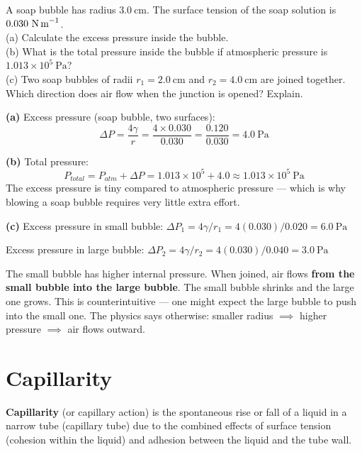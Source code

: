 \begin{examplebox}[12.2]
A soap bubble has radius $3.0\ \text{cm}$.
The surface tension of the soap solution is
$0.030\ \text{N\,m}^{-1}$.\\
(a) Calculate the excess pressure inside the bubble.\\
(b) What is the total pressure inside the bubble if
atmospheric pressure is $1.013\times10^5\ \text{Pa}$?\\
(c) Two soap bubbles of radii $r_1 = 2.0\ \text{cm}$
and $r_2 = 4.0\ \text{cm}$ are joined together.
Which direction does air flow when the junction is
opened? Explain.
\end{examplebox}

\begin{solutionbox}
\textbf{(a)} Excess pressure (soap bubble, two surfaces):
\[
  \Delta P = \frac{4\gamma}{r}
  = \frac{4 \times 0.030}{0.030}
  = \frac{0.120}{0.030} = 4.0\ \text{Pa}
\]

\textbf{(b)} Total pressure:
\[
  P_{total} = P_{atm} + \Delta P
  = 1.013\times10^5 + 4.0
  \approx 1.013\times10^5\ \text{Pa}
\]
The excess pressure is tiny compared to atmospheric
pressure --- which is why blowing a soap bubble
requires very little extra effort.

\textbf{(c)} Excess pressure in small bubble:
$\Delta P_1 = 4\gamma/r_1 = 4(0.030)/0.020
= 6.0\ \text{Pa}$

Excess pressure in large bubble:
$\Delta P_2 = 4\gamma/r_2 = 4(0.030)/0.040
= 3.0\ \text{Pa}$

The small bubble has higher internal pressure.
When joined, air flows \textbf{from the small bubble
into the large bubble}. The small bubble shrinks and
the large one grows. This is counterintuitive ---
one might expect the large bubble to push into the
small one. The physics says otherwise: smaller radius
$\implies$ higher pressure $\implies$ air flows outward.
\end{solutionbox}

\section{Capillarity}

\begin{definitionbox}[Capillarity]
\textbf{Capillarity} (or capillary action) is the
spontaneous rise or fall of a liquid in a narrow tube
(capillary tube) due to the combined effects of
surface tension (cohesion within the liquid) and
adhesion between the liquid and the tube wall.
\end{definitionbox}

